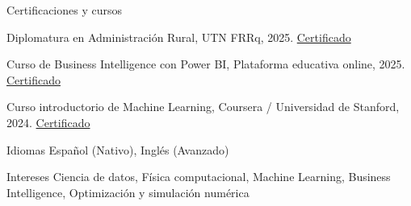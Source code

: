 \documentclass[a4paper,10pt]{resume}
\begin{document}
\begin{rSection}{Certificaciones y cursos}
\item Diplomatura en Administración Rural, UTN FRRq, 2025. \href{https://example.com/certificado-administracion-rural}{Certificado}
\item Curso de Business Intelligence con Power BI, Plataforma educativa online, 2025. \href{https://example.com/certificado-power-bi}{Certificado}
\item Curso introductorio de Machine Learning, Coursera / Universidad de Stanford, 2024. \href{https://www.coursera.org/account/accomplishments/certificate/EXAMPLE}{Certificado}
\end{rSection}
\begin{rSection}{Idiomas}
Español (Nativo), Inglés (Avanzado)
\end{rSection}
\begin{rSection}{Intereses}
Ciencia de datos, Física computacional, Machine Learning, Business Intelligence, Optimización y simulación numérica
\end{rSection}
\end{document}
